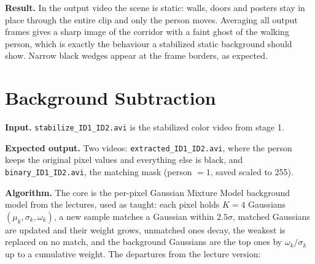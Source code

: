 \documentclass[11pt]{article}
\begin{document}
\noindent
\textbf{Result.} In the output video the scene is static: walls, doors and posters stay in
place through the entire clip and only the person moves. Averaging all output frames gives a
sharp image of the corridor with a faint ghost of the walking person, which is exactly the
behaviour a stabilized static background should show. Narrow black wedges appear at the frame
borders, as expected.


\section{Background Subtraction}

\noindent
\textbf{Input.} \texttt{stabilize\_ID1\_ID2.avi} is the stabilized color video from stage 1.

\medskip
\noindent
\textbf{Expected output.} Two videos: \texttt{extracted\_ID1\_ID2.avi}, where the person keeps
the original pixel values and everything else is black, and \texttt{binary\_ID1\_ID2.avi}, the
matching mask (person $=1$, saved scaled to 255).

\medskip
\noindent
\textbf{Algorithm.} The core is the per-pixel Gaussian Mixture Model background model from the
lectures, used as taught: each pixel holds $K=4$ Gaussians $(\mu_k, \sigma_k, \omega_k)$, a new
sample matches a Gaussian within $2.5\sigma$, matched Gaussians are updated and their weight
grows, unmatched ones decay, the weakest is replaced on no match, and the background Gaussians
are the top ones by $\omega_k/\sigma_k$ up to a cumulative weight. The departures from the lecture version:
\end{document}

